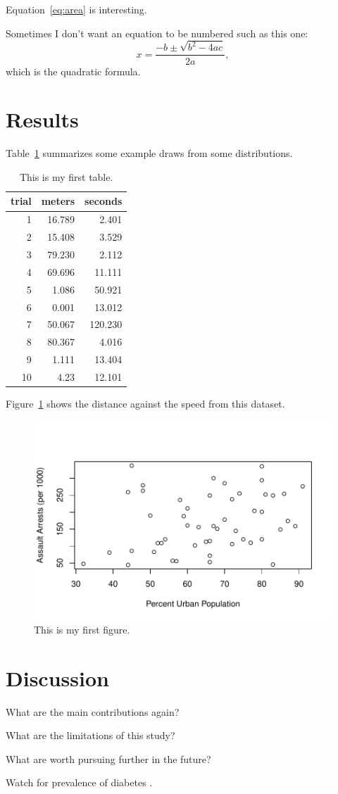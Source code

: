 \documentclass[12pt]{article}
\begin{document}
Equation~\eqref{eq:area} is interesting. \lipsum[1-4]

Sometimes I don't want an equation to be numbered such as this one:
\[
  x = \frac{-b \pm \sqrt{b^2 - 4ac}}{2a},
\]
which is the quadratic formula.



\section{Results}
\label{sec:resu}

Table~\ref{tab:rv} summarizes some example draws from some distributions.
\lipsum[1-4]

\begin{table}[tbp]
  \caption{This is my first table.}
  \label{tab:rv}
\centering
\begin{tabular}{rrr}
  \toprule
trial & meters & seconds \\ 
  \midrule
1 & 16.789 & 2.401 \\ 
  2 & 15.408 & 3.529 \\ 
  3 & 79.230 & 2.112 \\ 
  4 & 69.696 & 11.111 \\ 
  5 & 1.086 & 50.921 \\ 
  6 & 0.001 & 13.012 \\ 
  7 & 50.067 & 120.230 \\ 
  8 & 80.367 & 4.016 \\ 
  9 & 1.111 & 13.404 \\ 
  10 & 4.23 & 12.101 \\ 
   \bottomrule
\end{tabular}
\end{table}

Figure~\ref{fig:USarrests} shows the distance against the speed from this dataset.


\begin{figure}[tbp]
  \centering
  \includegraphics[width=\textwidth]{USarrests.pdf}
  \caption{This is my first figure.}
  \label{fig:USarrests}
\end{figure}

\section{Discussion}
\label{sec:disc}

What are the main contributions again?

What are the limitations of this study?

What are worth pursuing further in the future?

\lipsum[1-2]
Watch for prevalence of diabetes \citep{Tiancai2019analysis}.



\end{document}
